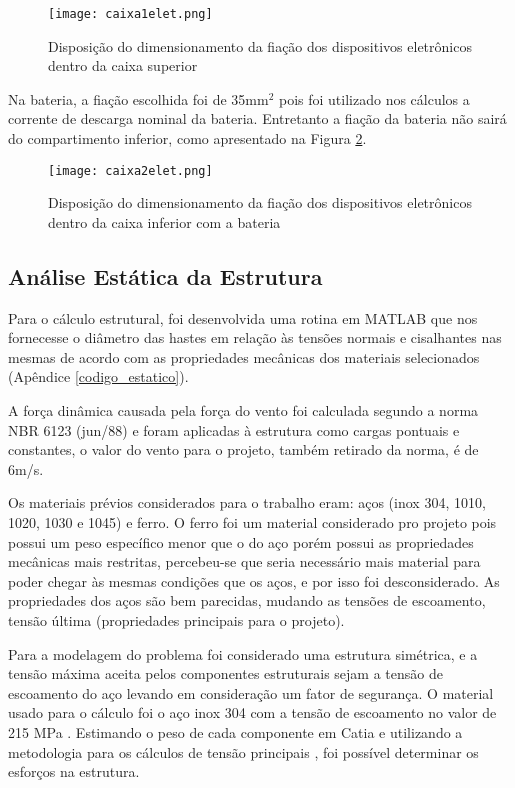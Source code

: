 \begin{figure}[h]
	\centering
    \texttt{[image: caixa1elet.png]}
    \caption{Disposição do dimensionamento da fiação dos dispositivos eletrônicos dentro da caixa superior}
    \label{caixa1elet}
\end{figure}


 Na bateria, a fiação escolhida foi de 35mm$^2$ pois foi utilizado nos cálculos a corrente de descarga nominal da bateria. Entretanto a fiação da bateria não sairá do compartimento inferior, como apresentado na Figura \ref{caixa2elet}.

\begin{figure}[h]
	\centering
    \texttt{[image: caixa2elet.png]}
    \caption{Disposição do dimensionamento da fiação dos dispositivos eletrônicos dentro da caixa inferior com a bateria}
    \label{caixa2elet}
\end{figure}



\subsection{Análise Estática da Estrutura}

Para o cálculo estrutural, foi desenvolvida uma rotina em MATLAB que nos fornecesse o diâmetro das hastes em relação às tensões normais e cisalhantes nas mesmas de acordo com as propriedades mecânicas dos materiais selecionados (Apêndice \ref{codigo_estatico}).


A força dinâmica causada pela força do vento foi calculada segundo a norma NBR 6123 (jun/88) \cite{vento} e foram aplicadas à estrutura como cargas pontuais e constantes, o valor do vento para o projeto, também retirado da norma, é de 6m/s.	

Os materiais prévios considerados para o trabalho eram: aços (inox 304, 1010, 1020, 1030 e 1045) e ferro. O ferro foi um material considerado pro projeto pois possui um peso específico menor que o do aço porém possui as propriedades mecânicas mais restritas, percebeu-se que seria necessário mais material para poder chegar às mesmas condições que os aços, e por isso foi desconsiderado. As propriedades dos aços são bem parecidas, mudando as tensões de escoamento, tensão última (propriedades principais para o projeto).

Para a modelagem do problema foi considerado uma estrutura simétrica, e a tensão máxima aceita pelos componentes estruturais sejam a tensão de escoamento do aço levando em consideração um fator de segurança. O material usado para o cálculo foi o aço inox 304 com a tensão de escoamento no valor de 215 MPa \cite{callister}. Estimando o peso de cada componente em Catia e utilizando a metodologia para os cálculos de tensão principais \cite{beer}, foi possível determinar os esforços na estrutura.

